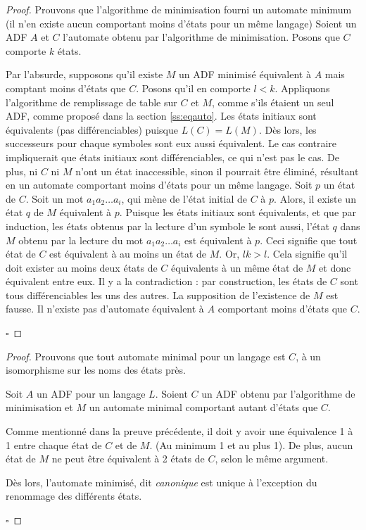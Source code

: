 \begin{proof}
 Prouvons que l'algorithme de minimisation fourni un automate minimum (il n'en existe aucun comportant moins d'états pour un même langage)
 Soient un ADF $A$ et $C$ l'automate obtenu par l'algorithme de minimisation. Posons que $C$ comporte $k$ états.

 Par l'absurde, supposons qu'il existe $M$ un ADF minimisé équivalent à $A$ mais comptant moins d'états que $C$. Posons qu'il en comporte $l<k$.
 Appliquons l'algorithme de remplissage de table sur $C$ et $M$, comme s'ils étaient un seul ADF, comme proposé dans la section \ref{ss:eqauto}. Les états initiaux sont équivalents (pas différenciables) puisque $L(C)=L(M)$. Dès lors, les successeurs pour chaque symboles sont eux aussi équivalent. Le cas contraire impliquerait que états initiaux sont différenciables, ce qui n'est pas le cas.
 De plus, ni $C$ ni $M$ n'ont un état inaccessible, sinon il pourrait être éliminé, résultant en un automate comportant moins d'états pour un même langage.
 Soit $p$ un état de $C$. Soit un mot $a_1a_2\dots a_i$, qui mène de l'état initial de $C$ à $p$. Alors, il existe un état $q$ de $M$ équivalent à $p$. Puisque les états initiaux sont équivalents, et que par induction, les états obtenus par la lecture d'un symbole le sont aussi, l'état $q$ dans $M$ obtenu par la lecture du mot $a_1a_2\dots a_i$ est équivalent à $p$. Ceci signifie que tout état de $C$ est équivalent à au moins un état de $M$.
 Or, $lk>l$. Cela signifie qu'il doit exister au moins deux états de $C$ équivalents à un même état de $M$ et donc équivalent entre eux. Il y a la contradiction : par construction, les états de $C$ sont tous différenciables les uns des autres. La supposition de l'existence de $M$ est fausse. Il n'existe pas d'automate équivalent à $A$ comportant moins d'états que $C$.

 \hfill$\square$
\end{proof}

\begin{proof}
 Prouvons que tout automate minimal pour un langage est $C$, à un isomorphisme sur les noms des états près.

 Soit $A$ un ADF pour un langage $L$. Soient $C$ un ADF obtenu par l'algorithme de minimisation et $M$ un automate minimal comportant autant d'états que $C$.

 Comme mentionné dans la preuve précédente, il doit y avoir une équivalence 1 à 1 entre chaque état de $C$ et de $M$. (Au minimum 1 et au plus 1). De plus, aucun état de $M$ ne peut être équivalent à 2 états de $C$, selon le même argument.

 Dès lors, l'automate minimisé, dit \emph{canonique} est unique à l'exception du renommage des différents états.

 \hfill$\square$
\end{proof}


